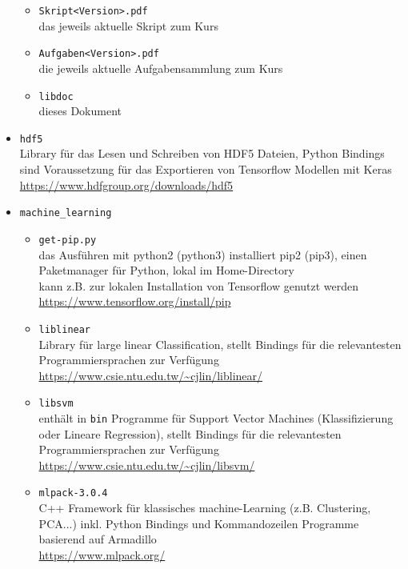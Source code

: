 \documentclass[headsepline=3pt,headinclude=true,12pt,oneside]{scrartcl}
\let\li=\lstinline
\begin{document}
\begin{itemize}
\begin{itemize}
			\item \li`Skript<Version>.pdf` \\
			das jeweils aktuelle Skript zum Kurs
			
			\item \li`Aufgaben<Version>.pdf` \\
			die jeweils aktuelle Aufgabensammlung zum Kurs
			
			\item \li`libdoc` \\
			dieses Dokument
		\end{itemize}  
		
		\item \li`hdf5` \\
		Library für das Lesen und Schreiben von HDF5 Dateien, Python Bindings sind Voraussetzung für das Exportieren von Tensorflow Modellen mit Keras \\
		\url{https://www.hdfgroup.org/downloads/hdf5}
		  
		\item \li`machine_learning` 		
		\begin{itemize} 
			\item \li`get-pip.py` \\
			das Ausführen mit python2 (python3) installiert pip2 (pip3), einen Paketmanager für Python, lokal im Home-Directory \\
			kann z.B. zur lokalen Installation von Tensorflow genutzt werden \\
			\url{https://www.tensorflow.org/install/pip}
			
			\item \li`liblinear` \\  
			Library für large linear Classification, stellt Bindings für die relevantesten Programmiersprachen zur Verfügung \\
			\url{https://www.csie.ntu.edu.tw/~cjlin/liblinear/}
			
			\item \li`libsvm` \\
			enthält in \li`bin` Programme für Support Vector Machines (Klassifizierung oder Lineare Regression), stellt Bindings für die relevantesten Programmiersprachen zur Verfügung \\
			\url{https://www.csie.ntu.edu.tw/~cjlin/libsvm/}			
			
			\item \li`mlpack-3.0.4` \\
			C++ Framework für klassisches machine-Learning (z.B. Clustering, PCA...) inkl. Python Bindings und Kommandozeilen Programme basierend auf Armadillo \\
			\url{https://www.mlpack.org/}
			

\end{itemize}
\end{itemize}
\end{document}
